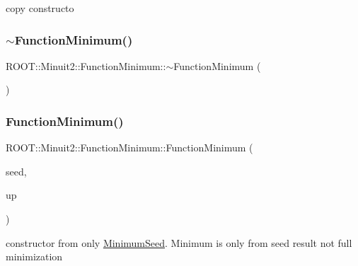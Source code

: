 copy constructo 

\mbox{\label{classROOT_1_1Minuit2_1_1FunctionMinimum_aaaef452fc02a74a63a9390329ed1dd04}} 
\subsubsection{\texorpdfstring{$\sim$FunctionMinimum()}{~FunctionMinimum()}\hspace{0.1cm}{\footnotesize\ttfamily [1/3]}}
{\footnotesize\ttfamily R\+O\+O\+T\+::\+Minuit2\+::\+Function\+Minimum\+::$\sim$\+Function\+Minimum (\begin{DoxyParamCaption}{ }\end{DoxyParamCaption})\hspace{0.3cm}{\ttfamily [inline]}}

\mbox{\label{classROOT_1_1Minuit2_1_1FunctionMinimum_a907871106f0be755404d80f32fbe2041}} 
\subsubsection{\texorpdfstring{FunctionMinimum()}{FunctionMinimum()}\hspace{0.1cm}{\footnotesize\ttfamily [6/15]}}
{\footnotesize\ttfamily R\+O\+O\+T\+::\+Minuit2\+::\+Function\+Minimum\+::\+Function\+Minimum (\begin{DoxyParamCaption}\item[{const \mbox{\hyperlink{classROOT_1_1Minuit2_1_1MinimumSeed}{Minimum\+Seed}} \&}]{seed,  }\item[{double}]{up }\end{DoxyParamCaption})\hspace{0.3cm}{\ttfamily [inline]}}



constructor from only \mbox{\hyperlink{classROOT_1_1Minuit2_1_1MinimumSeed}{Minimum\+Seed}}. Minimum is only from seed result not full minimization 

